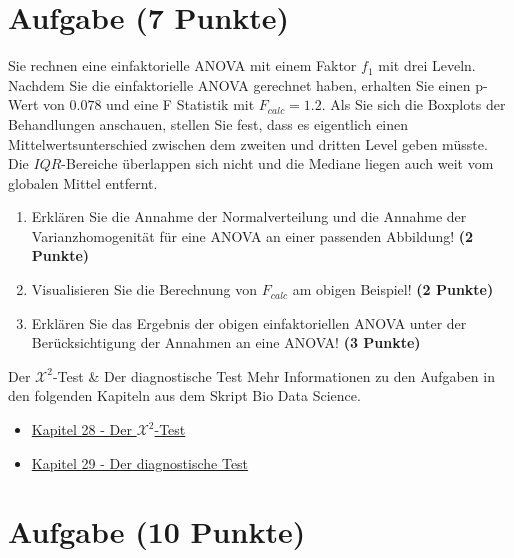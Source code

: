 \documentclass[a4paper, 10pt]{scrartcl}\usepackage[]{graphicx}\usepackage[]{xcolor}
\begin{document}
 
\clearpage

\section{Aufgabe \hfill (7 Punkte)}



Sie rechnen eine einfaktorielle ANOVA mit einem Faktor $f_1$ mit
drei Leveln. Nachdem Sie die einfaktorielle ANOVA gerechnet
haben, erhalten Sie einen p-Wert von $0.078$ und eine F Statistik mit
$F_{calc} = 1.2$. Als Sie sich die Boxplots der Behandlungen anschauen,
stellen Sie fest, dass es eigentlich einen Mittelwertsunterschied zwischen
dem zweiten und dritten Level geben m{\"u}sste. Die
$IQR$-Bereiche {\"u}berlappen sich nicht und die Mediane liegen auch weit vom
globalen Mittel entfernt.


\begin{enumerate}
\item Erkl{\"a}ren Sie die Annahme der Normalverteilung und die Annahme der
  Varianzhomogenit{\"a}t f{\"u}r eine ANOVA an einer passenden Abbildung! \textbf{(2 Punkte)}
\item Visualisieren Sie die Berechnung von $F_{calc}$ am obigen Beispiel!
  \textbf{(2 Punkte)}
\item Erkl{\"a}ren Sie das Ergebnis der obigen einfaktoriellen ANOVA unter der
  Ber{\"u}cksichtigung der Annahmen an eine ANOVA! \textbf{(3 Punkte)}
\end{enumerate}

 
\clearpage
  \begin{graybox}{Der $\mathcal{X}^2$-Test \& Der diagnostische Test}
Mehr Informationen zu den Aufgaben in den folgenden Kapiteln aus dem Skript Bio Data Science.
  \begin{itemize}
  \item \href{https://jkruppa.github.io/stat-tests-chi-test.html}{Kapitel 28 - Der $\mathcal{X}^2$-Test}
  \item \href{https://jkruppa.github.io/stat-tests-diagnostic.html}{Kapitel 29 - Der diagnostische Test}
  \end{itemize}
\end{graybox}

\section{Aufgabe \hfill (10 Punkte)}
\end{document}
